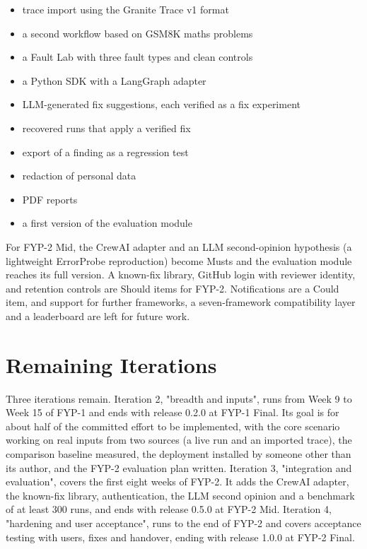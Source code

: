 \begin{itemize}
\item trace import using the Granite Trace v1 format
\item a second workflow based on GSM8K maths problems
\item a Fault Lab with three fault types and clean controls
\item a Python SDK with a LangGraph adapter
\item LLM-generated fix suggestions, each verified as a fix experiment
\item recovered runs that apply a verified fix
\item export of a finding as a regression test
\item redaction of personal data
\item PDF reports
\item a first version of the evaluation module
\end{itemize}

For FYP-2 Mid, the CrewAI adapter and an LLM second-opinion hypothesis (a lightweight ErrorProbe reproduction) become Musts and the evaluation module reaches its full version. A known-fix library, GitHub login with reviewer identity, and retention controls are Should items for FYP-2. Notifications are a Could item, and support for further frameworks, a seven-framework compatibility layer and a leaderboard are left for future work.

\section{Remaining Iterations}

Three iterations remain. Iteration 2, "breadth and inputs", runs from Week 9 to Week 15 of FYP-1 and ends with release 0.2.0 at FYP-1 Final. Its goal is for about half of the committed effort to be implemented, with the core scenario working on real inputs from two sources (a live run and an imported trace), the comparison baseline measured, the deployment installed by someone other than its author, and the FYP-2 evaluation plan written. Iteration 3, "integration and evaluation", covers the first eight weeks of FYP-2. It adds the CrewAI adapter, the known-fix library, authentication, the LLM second opinion and a benchmark of at least 300 runs, and ends with release 0.5.0 at FYP-2 Mid. Iteration 4, "hardening and user acceptance", runs to the end of FYP-2 and covers acceptance testing with users, fixes and handover, ending with release 1.0.0 at FYP-2 Final.

